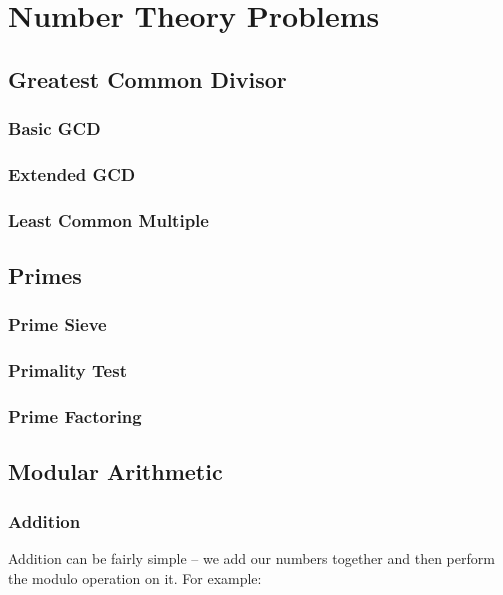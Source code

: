 \section{Number Theory Problems}

\subsection{Greatest Common Divisor}

\subsubsection{Basic GCD}

\subsubsection{Extended GCD}

\subsubsection{Least Common Multiple}

\subsection{Primes}

\subsubsection{Prime Sieve}

\subsubsection{Primality Test}

\subsubsection{Prime Factoring}

\subsection{Modular Arithmetic}

\subsubsection{Addition}

Addition can be fairly simple -- we add our numbers together and then perform the modulo operation on it. For example:

